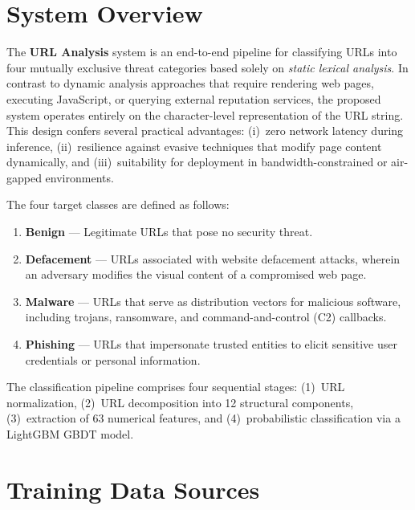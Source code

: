 \documentclass[a4paper,12pt]{article}
\begin{document}
\newpage
\tableofcontents
\newpage

\section{System Overview}
\label{sec:overview}

The \textbf{URL Analysis} system is an end-to-end pipeline for classifying URLs into four mutually exclusive threat categories based solely on \textit{static lexical analysis}. In contrast to dynamic analysis approaches that require rendering web pages, executing JavaScript, or querying external reputation services, the proposed system operates entirely on the character-level representation of the URL string. This design confers several practical advantages: (i)~zero network latency during inference, (ii)~resilience against evasive techniques that modify page content dynamically, and (iii)~suitability for deployment in bandwidth-constrained or air-gapped environments.

The four target classes are defined as follows:
\begin{enumerate}[label=(\roman*)]
    \item \textbf{Benign} --- Legitimate URLs that pose no security threat.
    \item \textbf{Defacement} --- URLs associated with website defacement attacks, wherein an adversary modifies the visual content of a compromised web page.
    \item \textbf{Malware} --- URLs that serve as distribution vectors for malicious software, including trojans, ransomware, and command-and-control (C2) callbacks.
    \item \textbf{Phishing} --- URLs that impersonate trusted entities to elicit sensitive user credentials or personal information.
\end{enumerate}

The classification pipeline comprises four sequential stages: (1)~URL normalization, (2)~URL decomposition into 12 structural components, (3)~extraction of 63 numerical features, and (4)~probabilistic classification via a LightGBM GBDT model.

\section{Training Data Sources}
\label{sec:data}
\end{document}
